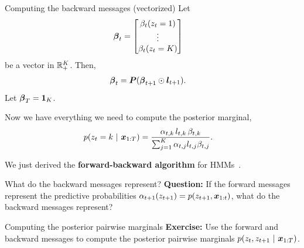 \documentclass[aspectratio=169]{beamer}
\begin{document}
\begin{frame}{Computing the backward messages (vectorized)}
    Let 
    \begin{align}
        \boldsymbol{\beta}_t &= 
        \begin{bmatrix}
        \beta_t(z_t = 1) \\
        \vdots \\
        \beta_t(z_t=K)
        \end{bmatrix}
    \end{align}
    be a vector in $\mathbb{R}_+^K$. Then,
    \begin{align}
        \boldsymbol{\beta}_{t} &= \boldsymbol{P} (\boldsymbol{\beta}_{t+1} \odot \boldsymbol{l}_{t+1}).
    \end{align}
    Let $\boldsymbol{\beta}_T = \boldsymbol{1}_K$.
    
    Now we have everything we need to compute the posterior marginal,
    \begin{align}
        p(z_t = k ~\vert~ \boldsymbol{x}_{1:T}) &= \frac{\alpha_{t,k} \, l_{t,k} \, \beta_{t,k}}{\sum_{j=1}^K \alpha_{t,j} l_{t,j} \beta_{t,j}}.
    \end{align}
    
    We just derived the \textbf{forward-backward algorithm} for HMMs~\citep{rabiner1986introduction}.
\end{frame}

\begin{frame}[t]{What do the backward messages represent?}
\textbf{Question:} If the forward messages represent the predictive probabilities $\alpha_{t+1}(z_{t+1}) = p(z_{t+1}, \boldsymbol{x}_{1:t})$, what do the backward messages represent?
\end{frame}

\begin{frame}[t]{Computing the posterior pairwise marginals}
\textbf{Exercise:} Use the forward and backward messages to compute the posterior pairwise marginals $p(z_t, z_{t+1} ~\vert~ \boldsymbol{x}_{1:T})$.
\end{frame}


\end{document}
